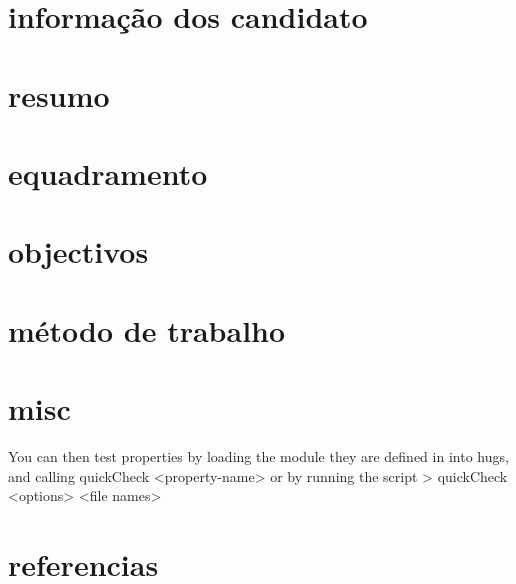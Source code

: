 
\maketitle
\section{informação dos candidato}
\section{resumo}
\section{equadramento}
\section{objectivos}
\section{método de trabalho}
\section{misc}
You can then test properties by loading the module they are defined in into hugs, and calling
quickCheck <property-name>
or by running the script
> quickCheck <options> <file names>
\section{referencias}

